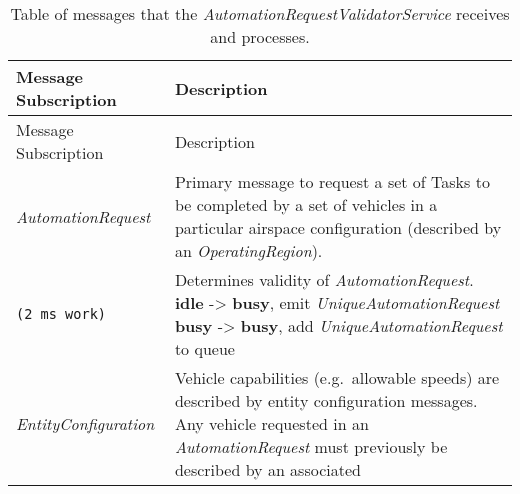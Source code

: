 \begin{longtable}[c]{@{}ll@{}}
\caption{Table of messages that the
\emph{AutomationRequestValidatorService} receives and
processes.}\tabularnewline
\toprule
\begin{minipage}[b]{0.29\columnwidth}\raggedright\strut
Message Subscription
\strut\end{minipage} &
\begin{minipage}[b]{0.65\columnwidth}\raggedright\strut
Description
\strut\end{minipage}\tabularnewline
\midrule
\endfirsthead
\toprule
\begin{minipage}[b]{0.29\columnwidth}\raggedright\strut
Message Subscription
\strut\end{minipage} &
\begin{minipage}[b]{0.65\columnwidth}\raggedright\strut
Description
\strut\end{minipage}\tabularnewline
\midrule
\endhead
\begin{minipage}[t]{0.29\columnwidth}\raggedright\strut
\emph{AutomationRequest}
\strut\end{minipage} &
\begin{minipage}[t]{0.65\columnwidth}\raggedright\strut
Primary message to request a set of Tasks to be completed by a set of
vehicles in a particular airspace configuration (described by an
\emph{OperatingRegion}).
\strut\end{minipage}\tabularnewline
\begin{minipage}[t]{0.29\columnwidth}\raggedright\strut
\begin{verbatim}
(2 ms work)
\end{verbatim}
\strut\end{minipage} &
\begin{minipage}[t]{0.65\columnwidth}\raggedright\strut
Determines validity of \emph{AutomationRequest}. \textbf{idle}
-\textgreater{} \textbf{busy}, emit \emph{UniqueAutomationRequest}
\textbf{busy} -\textgreater{} \textbf{busy}, add
\emph{UniqueAutomationRequest} to queue
\strut\end{minipage}\tabularnewline
\begin{minipage}[t]{0.29\columnwidth}\raggedright\strut
\emph{EntityConfiguration}
\strut\end{minipage} &
\begin{minipage}[t]{0.65\columnwidth}\raggedright\strut
Vehicle capabilities (e.g.~allowable speeds) are described by entity
configuration messages. Any vehicle requested in an
\emph{AutomationRequest} must previously be described by an associated

\end{minipage}
\end{longtable}
